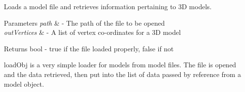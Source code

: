 Loads a model file and retrieves information pertaining to 3\+D models. 


\begin{DoxyParams}{Parameters}
{\em path} & -\/ The path of the file to be opened \\
\hline
{\em out\+Vertices} & -\/ A list of vertex co-\/ordinates for a 3\+D model \\
\hline
\end{DoxyParams}
\begin{DoxyReturn}{Returns}
bool -\/ true if the file loaded properly, false if not
\end{DoxyReturn}
load\+Obj is a very simple loader for models from model files. The file is opened and the data retrieved, then put into the list of data passed by reference from a model object. 